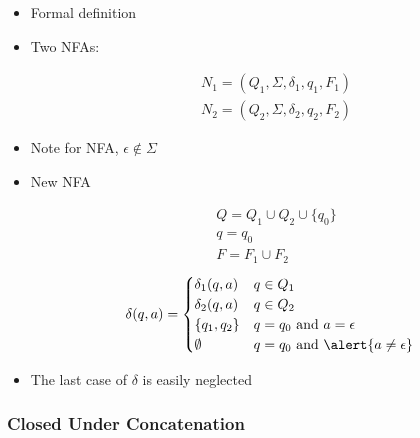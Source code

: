 \begin{frame}[allowframebreaks]
\begin{itemize}
\item Formal definition

\item [] Two NFAs:

  \begin{equation*}
    \begin{split}
&N_1 =(Q_1, \Sigma, \delta_1, q_1, F_1) \\
& N_2 =(Q_2, \Sigma, \delta_2, q_2, F_2)
\end{split}
\end{equation*}
\item [] Note for NFA, $\epsilon \notin \Sigma$

\item New NFA

  \begin{equation*}
    \begin{split}
& Q=Q_1 \cup Q_2 \cup \{q_0\}\\
& q=q_0\\
& F=F_1\cup F_2
\end{split}
\end{equation*}
\begin{equation*}
  \delta(q,a)
=
\begin{cases}
  \delta_1(q,a) &  q \in Q_1\\
  \delta_2(q,a) &  q \in Q_2\\
\{q_1,q_2\} & q= q_0 \mbox{ and }  a = \epsilon \\
\emptyset & q = q_0 \mbox{ and } \alert{a \neq \epsilon}
\end{cases}
\end{equation*}
\item The last case of $\delta$ is easily neglected
\end{itemize}\end{frame} \begin{frame}[allowframebreaks] \frametitle{Closed Under Concatenation}


\end{frame}
